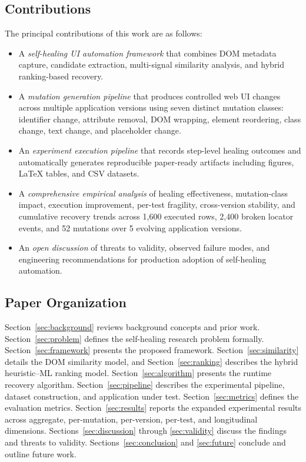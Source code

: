 \documentclass[conference]{IEEEtran}
\begin{document}
\subsection{Contributions}
The principal contributions of this work are as follows:
\begin{itemize}[leftmargin=1.2em]
    \item A \emph{self-healing UI automation framework} that combines DOM metadata capture, candidate extraction, multi-signal similarity analysis, and hybrid ranking-based recovery.
    \item A \emph{mutation generation pipeline} that produces controlled web UI changes across multiple application versions using seven distinct mutation classes: identifier change, attribute removal, DOM wrapping, element reordering, class change, text change, and placeholder change.
    \item An \emph{experiment execution pipeline} that records step-level healing outcomes and automatically generates reproducible paper-ready artifacts including figures, LaTeX tables, and CSV datasets.
    \item A \emph{comprehensive empirical analysis} of healing effectiveness, mutation-class impact, execution improvement, per-test fragility, cross-version stability, and cumulative recovery trends across 1{,}600 executed rows, 2{,}400 broken locator events, and 52 mutations over 5 evolving application versions.
    \item An \emph{open discussion} of threats to validity, observed failure modes, and engineering recommendations for production adoption of self-healing automation.
\end{itemize}

\subsection{Paper Organization}
Section~\ref{sec:background} reviews background concepts and prior work. Section~\ref{sec:problem} defines the self-healing research problem formally. Section~\ref{sec:framework} presents the proposed framework. Section~\ref{sec:similarity} details the DOM similarity model, and Section~\ref{sec:ranking} describes the hybrid heuristic--ML ranking model. Section~\ref{sec:algorithm} presents the runtime recovery algorithm. Section~\ref{sec:pipeline} describes the experimental pipeline, dataset construction, and application under test. Section~\ref{sec:metrics} defines the evaluation metrics. Section~\ref{sec:results} reports the expanded experimental results across aggregate, per-mutation, per-version, per-test, and longitudinal dimensions. Sections~\ref{sec:discussion} through \ref{sec:validity} discuss the findings and threats to validity. Sections~\ref{sec:conclusion} and \ref{sec:future} conclude and outline future work.
\end{document}
